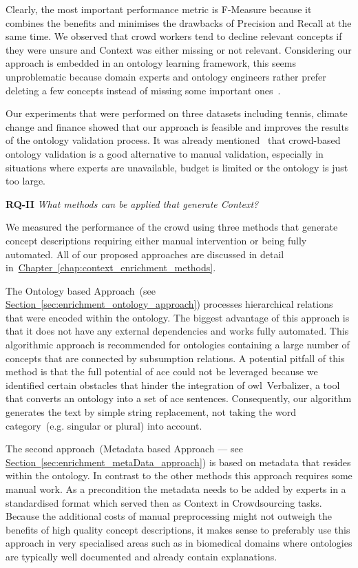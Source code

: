 Clearly, the most important performance metric is F-Measure because it combines the benefits and minimises the drawbacks of Precision and Recall at the same time. We observed that crowd workers tend to decline relevant concepts if they were unsure and Context was either missing or not relevant. Considering our approach is embedded in an ontology learning framework, this seems unproblematic because domain experts and ontology engineers rather prefer deleting a few concepts instead of missing some important ones~\cite{sabou2006}. 

Our experiments that were performed on three datasets including tennis, climate change and finance showed that our approach is feasible and improves the results of the ontology validation process. It was already mentioned~\cite{mortensen2015, mortensen2016, wohlgenannt2016} that crowd-based ontology validation is a good alternative to manual validation, especially in situations where experts are unavailable, budget is limited or the ontology is just too large. 

\textbf{RQ-II} \emph{What methods can be applied that generate Context?}

We measured the performance of the crowd using three methods that generate concept descriptions requiring either manual intervention or being fully automated. All of our proposed approaches are discussed in detail in~\hyperref[chap:context_enrichment_methods]{Chapter~\ref*{chap:context_enrichment_methods}}. 

The Ontology based Approach~(see \hyperref[sec:enrichment_ontology_approach]{Section~\ref*{sec:enrichment_ontology_approach}}) processes hierarchical relations that were encoded within the ontology. The biggest advantage of this approach is that it does not have any external dependencies and works fully automated. This algorithmic approach is recommended for ontologies containing a large number of concepts that are connected by subsumption relations. A potential pitfall of this method is that the full potential of \gls{ace} could not be leveraged because we identified certain obstacles that hinder the integration of \gls{owl}~Verbalizer, a tool that converts an ontology into a set of \gls{ace} sentences. Consequently, our algorithm generates the text by simple string replacement, not taking the word category~(e.g. singular or plural) into account. 

The second approach~(Metadata based Approach --- see \hyperref[sec:enrichment_metaData_approach]{Section~\ref*{sec:enrichment_metaData_approach}})
is based on metadata that resides within the ontology. In contrast to the other methods this approach requires some manual work. As a precondition 
the metadata needs to be added by experts in a standardised format which served then as Context in Crowdsourcing tasks. Because the additional costs of manual preprocessing might not outweigh the benefits of high quality concept descriptions, it makes sense to preferably use this approach in very specialised areas such as in biomedical domains where ontologies are typically well documented and already contain explanations.

